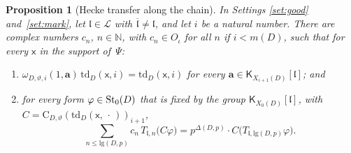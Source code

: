 \documentclass[11pt,a4paper]{article}
\theoremstyle{plainx}
\newtheorem{proposition}[theorem]{Proposition}
\theoremstyle{uprightx}
\newcommand{\NN}{\mathbb{N}}
\newcommand{\cj}[1]{\overline{#1}}
\newcommand{\Oj}{O_{\iota}}                                   %
\newcommand{\mD}[1]{m(#1)}
\newcommand{\XD}[2]{X_{#2}(#1)}
\newcommand{\rr}[2]{\mathrm{lg}(#1,#2)}
\newcommand{\DeltaP}[2]{\Delta(#1,#2)}
\newcommand{\td}[3]{\mathrm{td}_{#1}(#2,#3)}
\newcommand{\lkom}[3]{\omega_{#1,#2,#3}}
\newcommand{\chn}[4]{\mathrm{C}_{#1,#2}(#3)_{#4}}
\newcommand{\Kmax}[2]{\mathsf{K}_{#1}[#2]}
\newcommand{\Tl}[2]{T_{#1,#2}}
\begin{document}
\begin{proposition}[Hecke transfer along the chain]\label{p:hecke}
In Settings \ref{set:good} and~\ref{set:mark}, let $\mathfrak{l}\in\mathcal{L}$ with
$\cj{\mathfrak{l}}\ne\mathfrak{l}$, and let $i$ be a natural number. There are complex numbers $c_n$,
$n\in\NN$, with $c_n\in\Oj$ for all $n$ if $i<\mD{D}$, such that for every $\mathsf{x}$ in the support of~$\Psi$:
\begin{enumerate}[label=(\alph*)]
\item $\lkom{D}{\vartheta}{i}(1,\mathbf{a})\,\td{D}{\mathsf{x}}{i}=\td{D}{\mathsf{x}}{i}$ for every
$\mathbf{a}\in\Kmax{\XD{D}{i+1}}{\mathfrak{l}}$; and
\item for every form $\varphi\in\Stg{D}{0}$ that is fixed by the group $\Kmax{\XD{D}{0}}{\mathfrak{l}}$, with
$C=\chn{D}{\vartheta}{\td{D}{\mathsf{x}}{\,\cdot\,}}{i+1}$,
\[\sum_{n\le\rr{D}{p}}c_n\,\Tl{\mathfrak{l}}{n}\bigl(C\varphi\bigr)=p^{\DeltaP{D}{p}}\cdot C\bigl(\Tl{\mathfrak{l}}{\rr{D}{p}}\varphi\bigr).\]
\end{enumerate}
\end{proposition}
\end{document}
